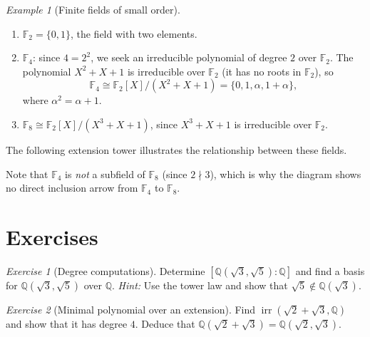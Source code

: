\documentclass[12pt,a4paper,openany]{book}
\theoremstyle{definition}
\theoremstyle{remark}
\newtheorem{example}{Example}[chapter]
\newtheorem{exercise}{Exercise}[chapter]
\newcommand{\Q}{\mathbb{Q}}
\newcommand{\F}{\mathbb{F}}
\DeclareMathOperator{\irr}{irr}
\begin{document}
\begin{example}[Finite fields of small order]
\label{ex:finite-fields-small}
\begin{enumerate}[label=(\roman*)]
  \item $\F_2 = \{0, 1\}$, the field with two elements.
  \item $\F_4$: since $4 = 2^2$, we seek an irreducible polynomial of
    degree $2$ over $\F_2$. The polynomial $X^2 + X + 1$ is
    irreducible over $\F_2$ (it has no roots in $\F_2$), so
    \[
      \F_4 \cong \F_2[X]/(X^2 + X + 1) = \{0, 1, \alpha, 1+\alpha\},
    \]
    where $\alpha^2 = \alpha + 1$.
  \item $\F_8 \cong \F_2[X]/(X^3 + X + 1)$, since $X^3 + X + 1$ is
    irreducible over $\F_2$.
\end{enumerate}
\end{example}

The following extension tower illustrates the relationship between
these fields.

\begin{center}
\end{center}

Note that $\F_4$ is \emph{not} a subfield of $\F_8$ (since $2 \nmid 3$),
which is why the diagram shows no direct inclusion arrow from $\F_4$ to
$\F_8$.

\section{Exercises}
\label{sec:ch8-exercises}

\begin{exercise}[Degree computations]
\label{exer:degree-computations}
Determine $[\Q(\sqrt{3}, \sqrt{5}) : \Q]$ and find a basis for
$\Q(\sqrt{3}, \sqrt{5})$ over $\Q$.
\textit{Hint:} Use the tower law and show that $\sqrt{5} \notin
\Q(\sqrt{3})$.
\end{exercise}

\begin{exercise}[Minimal polynomial over an extension]
\label{exer:min-poly-ext}
Find $\irr(\sqrt{2}+\sqrt{3}, \Q)$ and show that it has degree $4$.
Deduce that $\Q(\sqrt{2}+\sqrt{3}) = \Q(\sqrt{2}, \sqrt{3})$.
\end{exercise}
\end{document}
